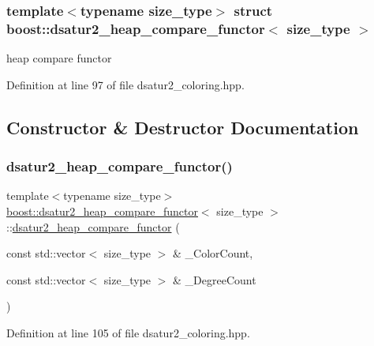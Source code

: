 \subsubsection*{template$<$typename size\+\_\+type$>$\newline
struct boost\+::dsatur2\+\_\+heap\+\_\+compare\+\_\+functor$<$ size\+\_\+type $>$}

heap compare functor 

Definition at line 97 of file dsatur2\+\_\+coloring.\+hpp.



\subsection{Constructor \& Destructor Documentation}
\mbox{\label{structboost_1_1dsatur2__heap__compare__functor_a95f2c0af2d6ad317d7d3c50310e35a33}} 
\subsubsection{\texorpdfstring{dsatur2\+\_\+heap\+\_\+compare\+\_\+functor()}{dsatur2\_heap\_compare\_functor()}}
{\footnotesize\ttfamily template$<$typename size\+\_\+type$>$ \\
\hyperlink{structboost_1_1dsatur2__heap__compare__functor}{boost\+::dsatur2\+\_\+heap\+\_\+compare\+\_\+functor}$<$ size\+\_\+type $>$\+::\hyperlink{structboost_1_1dsatur2__heap__compare__functor}{dsatur2\+\_\+heap\+\_\+compare\+\_\+functor} (\begin{DoxyParamCaption}\item[{const std\+::vector$<$ size\+\_\+type $>$ \&}]{\+\_\+\+Color\+Count,  }\item[{const std\+::vector$<$ size\+\_\+type $>$ \&}]{\+\_\+\+Degree\+Count }\end{DoxyParamCaption})\hspace{0.3cm}{\ttfamily [inline]}}



Definition at line 105 of file dsatur2\+\_\+coloring.\+hpp.



